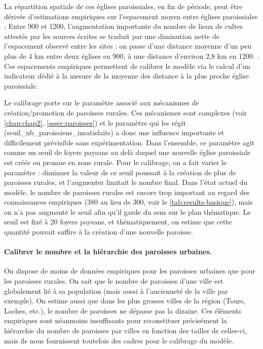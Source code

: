 La répartition spatiale de ces églises paroissiales, en fin de période, peut être dérivée d'estimations empiriques sur l'espacement moyen entre églises paroissiales :
\og Entre 900 et 1200, l'augmentation importante du nombre de lieux de cultes attestés par les sources écrites se traduit par une diminution nette de l'espacement observé entre les sites : on passe d'une distance moyenne d'un peu plus de 4 km entre deux églises en 900, à une distance d'environ 2,8 km en 1200.\fg{} \autocite[261]{chareille_dynamiques_2008}.
Ces espacements empiriques permettent de calibrer le modèle via le calcul d'un indicateur dédié à la mesure de la moyenne des distance à la plus proche église paroissiale.


Le calibrage porte sur le paramètre associé aux mécanismes de création/promotion de paroisses rurales.
Ces mécanismes sont complexes (voir \cref{chap:chap2}, \cref{sssec:paroisses}) et le paramètre qui les régit (\textsf{seuil\_nb\_paroissiens\_insatisfaits}) a donc une influence importante et difficilement prévisible sans expérimentation.
Dans l'ensemble, ce paramètre agit comme un seuil de foyers paysans au delà duquel une nouvelle église paroissiale est créée ou promue en zone rurale.
Pour le calibrage, on a fait varier le paramètre  : diminuer la valeur de ce seuil poussait à la création de plus de paroisses rurales, et l'augmenter limitait le nombre final.
Dans l'état actuel du modèle, le nombre de paroisses rurales est encore trop important au regard des connaissances empiriques (380 au lieu de 300, voir le \vref{tab:results-basique}), mais on n'a pas augmenté le seuil afin qu'il garde du sens sur le plan thématique.
Le seuil est fixé à 20 foyers paysans, et thématiquement, on estime que cette quantité pouvait suffire à la création d'une nouvelle paroisse.

\paragraph{Calibrer le nombre et la hiérarchie des paroisses \og urbaines\fg{}.}

On dispose de moins de données empiriques pour les paroisses urbaines que pour les paroisses rurales.
On sait que le nombre de paroisses d'une ville est globalement lié à sa population (mais aussi à l'ancienneté de la ville par exemple).
On estime aussi que dans les plus grosses villes de la région (Tours, Loches, etc.), le nombre de paroisses ne dépasse pas la dizaine.
Ces éléments empiriques sont néanmoins insuffisants pour reconstituer précisément la hiérarchie du nombre de paroisses par villes en fonction des tailles de celles-ci, mais ils nous fournissent toutefois des cadres pour le calibrage du modèle.


